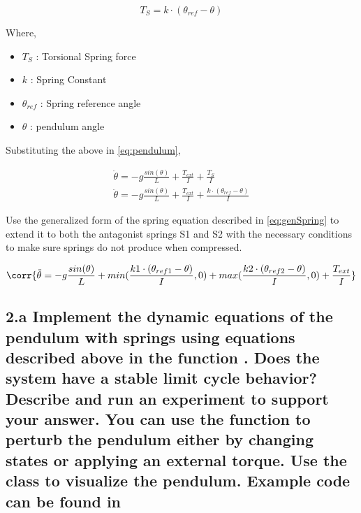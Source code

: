 \documentclass{cmc}
\begin{document}
\begin{equation}
  \label{eqn:spring}
  T_{S} = k \cdot (\theta_{ref} - \theta)
\end{equation}

Where,
\begin{itemize}
\item $T_{S}$ : Torsional Spring force
\item $k$ : Spring Constant
\item $\theta_{ref}$ : Spring reference angle
\item $\theta$ : pendulum angle
\end{itemize}

Substituting the above in \ref{eq:pendulum},

\begin{eqnarray}
  \label{eq:spring}
  \ddot{\theta} = -g\frac{sin(\theta)}{L} + \frac{T_{ext}}{I} + \frac{T_{S}}{I} \\
  \ddot{\theta} = -g\frac{sin(\theta)}{L} + \frac{T_{ext}}{I} + \frac{k \cdot (\theta_{ref} - \theta)}{I} \label{eq:genSpring}
\end{eqnarray}

Use the generalized form of the spring equation described in
\ref{eq:genSpring} to extend it to both the antagonist springs S1 and
S2 with the necessary conditions to make sure springs do not produce
when compressed.


\begin{equation}
  \corr{\ddot{\theta} = -g\frac{sin(\theta)}{L} + min(\frac{k1 \cdot (\theta_{ref1} - \theta)}{I}, 0) + max(\frac{k2 \cdot (\theta_{ref2} - \theta)}{I}, 0)+ \frac{T_{ext}}{I}}
\end{equation}


\subsection*{2.a Implement the dynamic equations of the pendulum with
  springs using equations described above in the function
  .  Does the system
  have a stable limit cycle behavior?  Describe and run an experiment
  to support your answer. You can use the function
   to perturb the
  pendulum either by changing states or applying an external torque.
  Use the class  to
  visualize the pendulum. Example code can be found in
  }
\label{subsec:2.a}
\end{document}
